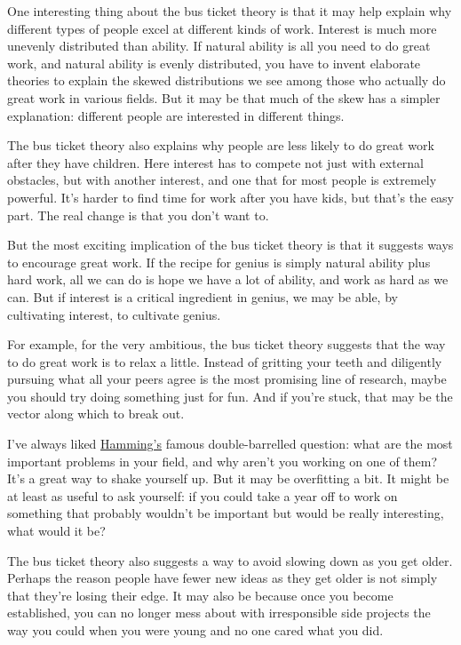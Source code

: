 One interesting thing about the bus ticket theory is that it may help
explain why different types of people excel at different kinds of work.
Interest is much more unevenly distributed than ability. If natural
ability is all you need to do great work, and natural ability is evenly
distributed, you have to invent elaborate theories to explain the skewed
distributions we see among those who actually do great work in various
fields. But it may be that much of the skew has a simpler explanation:
different people are interested in different things.

The bus ticket theory also explains why people are less likely to do
great work after they have children. Here interest has to compete not
just with external obstacles, but with another interest, and one that
for most people is extremely powerful. It's harder to find time for work
after you have kids, but that's the easy part. The real change is that
you don't want to.

But the most exciting implication of the bus ticket theory is that it
suggests ways to encourage great work. If the recipe for genius is
simply natural ability plus hard work, all we can do is hope we have a
lot of ability, and work as hard as we can. But if interest is a
critical ingredient in genius, we may be able, by cultivating interest,
to cultivate genius.

For example, for the very ambitious, the bus ticket theory suggests that
the way to do great work is to relax a little. Instead of gritting your
teeth and diligently pursuing what all your peers agree is the most
promising line of research, maybe you should try doing something just
for fun. And if you're stuck, that may be the vector along which to
break out.

I've always liked \href{hamming.html}{Hamming's} famous double-barrelled
question: what are the most important problems in your field, and why
aren't you working on one of them? It's a great way to shake yourself
up. But it may be overfitting a bit. It might be at least as useful to
ask yourself: if you could take a year off to work on something that
probably wouldn't be important but would be really interesting, what
would it be?

The bus ticket theory also suggests a way to avoid slowing down as you
get older. Perhaps the reason people have fewer new ideas as they get
older is not simply that they're losing their edge. It may also be
because once you become established, you can no longer mess about with
irresponsible side projects the way you could when you were young and no
one cared what you did.

